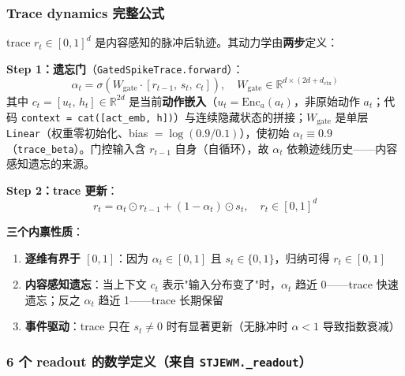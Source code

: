\documentclass[11pt,a4paper]{article}
\begin{document}
\subsubsection{Trace dynamics 完整公式}

trace $r_t \in [0, 1]^d$ 是内容感知的脉冲后轨迹。其动力学由\textbf{两步}定义：

\textbf{Step 1：遗忘门}（\texttt{GatedSpikeTrace.forward}）：
\[
\alpha_t = \sigma\!\left(W_\text{gate} \cdot [r_{t-1},\, s_t,\, c_t]\right), \quad W_\text{gate} \in \mathbb{R}^{d \times (2d + d_\text{ctx})}
\]
其中 $c_t = [u_t,\, h_t] \in \mathbb{R}^{2d}$ 是当前\textbf{动作嵌入}（$u_t = \mathrm{Enc}_a(a_t)$，非原始动作 $a_t$；代码 \texttt{context = cat([act\_emb, h])}）与连续隐藏状态的拼接；$W_\text{gate}$ 是单层 \texttt{Linear}（权重零初始化、bias $= \log(0.9/0.1)$），使初始 $\alpha_t \equiv 0.9$（\texttt{trace\_beta}）。门控输入含 $r_{t-1}$ 自身（自循环），故 $\alpha_t$ 依赖迹线历史——内容感知遗忘的来源。

\textbf{Step 2：trace 更新}：
\[
r_t = \alpha_t \odot r_{t-1} + (1 - \alpha_t) \odot s_t, \quad r_t \in [0, 1]^d
\]

\textbf{三个内禀性质}：
\begin{enumerate}[leftmargin=2em]
    \item \textbf{逐维有界于 $[0, 1]$}：因为 $\alpha_t \in [0,1]$ 且 $s_t \in \{0,1\}$，归纳可得 $r_t \in [0,1]$
    \item \textbf{内容感知遗忘}：当上下文 $c_t$ 表示"输入分布变了"时，$\alpha_t$ 趋近 0——trace 快速遗忘；反之 $\alpha_t$ 趋近 1——trace 长期保留
    \item \textbf{事件驱动}：trace 只在 $s_t \neq 0$ 时有显著更新（无脉冲时 $\alpha < 1$ 导致指数衰减）
\end{enumerate}

\subsubsection{6 个 readout 的数学定义（来自 \texttt{STJEWM.\_readout}）}
\end{document}

